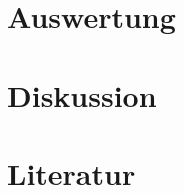 \documentclass[12pt, a4paper, twoside]{scrartcl}
\begin{document}
\section{Auswertung}
\label{sec:auswertung}

\section{Diskussion}
\label{sec:diskussion}

\section*{Literatur}
\end{document}
